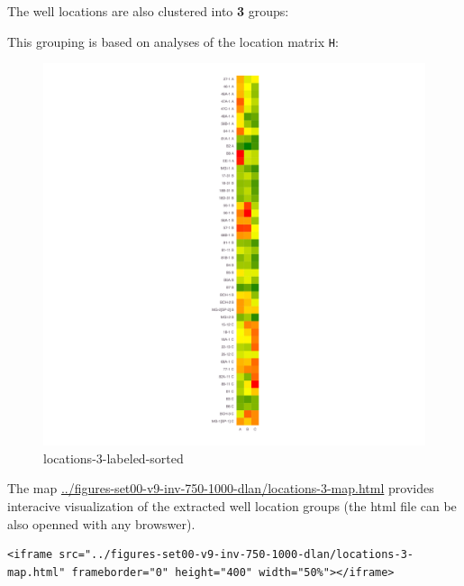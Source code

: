 \documentclass[11pt]{article}
\begin{document}
The well locations are also clustered into \textbf{3} groups:

This grouping is based on analyses of the location matrix \texttt{H}:

\begin{figure}
\centering
\includegraphics{../figures-set00-v9-inv-750-1000-dlan/locations-3-labeled-sorted.png}
\caption{locations-3-labeled-sorted}
\end{figure}

The map \url{../figures-set00-v9-inv-750-1000-dlan/locations-3-map.html}
provides interacive visualization of the extracted well location groups
(the html file can be also openned with any browswer).

\begin{verbatim}
<iframe src="../figures-set00-v9-inv-750-1000-dlan/locations-3-map.html" frameborder="0" height="400" width="50%"></iframe>
\end{verbatim}


    
    
    
\end{document}
